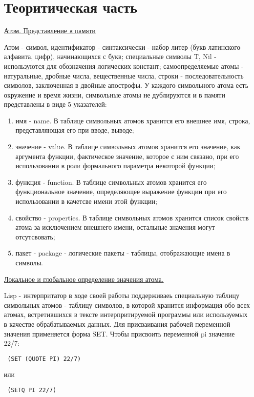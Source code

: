 \section{Теоритическая часть}
\newline
\underline{Атом. Представление в памяти}


Атом - символ, идентификатор - синтаксически - набор литер (букв латинского алфавита, цифр),
начинающихся с букв; специальные символы {T, Nil} - используются для обозначения логических констант;
самоопределяемые атомы - натуральные, дробные числа, вещественные числа, строки - последовательность
символов, заключенная в двойные апострофы. У каждого символьного атома есть окружение и время жизни, 
символьные атомы не дублируются и в памяти представлены в виде 5 указателей:
\begin{enumerate}
	\item имя - name. В таблице символьных атомов хранится его внешнее имя, строка, представляющая его при вводе, выводе;
	\item значение - value. В таблице символьных атомов хранится его значение, как аргумента функции, фактическое значение, которое с ним связано, при его использовании в роли формального параметра некоторой функции;
	\item функция - function. В таблице символьных атомов хранится его функциональное значение, определяющее выражение функции при его использовании в качетсве имени этой функции;
	\item свойство - properties. В таблице символьных атомов хранится список свойств атома за исключением внешнего имени, остальные значения могут отсутсвовать;
	\item пакет - package - логические пакеты - таблицы, отображающие имена в символы.
\end{enumerate}

\newline
\underline{Локальное и глобальное определение значения атома.}


Lisp - интерпритатор в ходе своей работы поддерживаеь специальную таблицу символьных атомов - таблицу символов, в которой хранится информация обо всех атомах, встретившихся в тексте интерпритируемой программы или используемых в качестве обрабатываемых данных. Для присваивания рабочей переменной значения применяется форма SET. Чтобы присвоить переменной pi значение 22/7: 
\begin{lstlisting} (SET (QUOTE PI) 22/7) \end{lstlisting}
или
\begin{lstlisting} (SETQ PI 22/7) \end{lstlisting}




